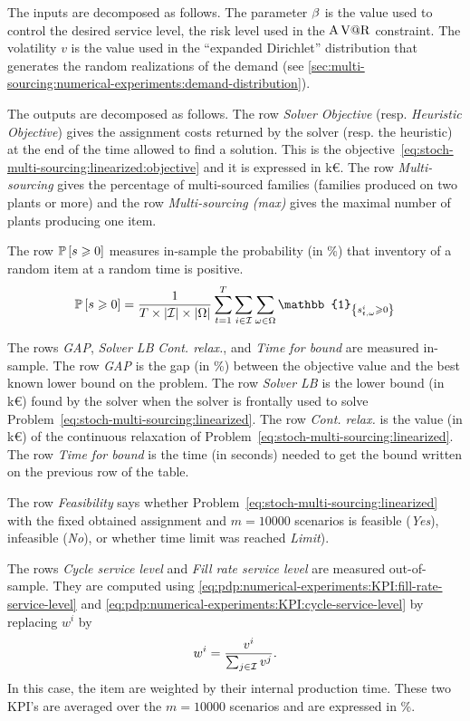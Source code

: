 The inputs are decomposed as follows.
The parameter $\beta$ is the value used to control the desired service level, \ie the risk level used in the $\operatorname{A\operatorname{V@R}}$ constraint.
The volatility $v$ is the value used in the ``expanded Dirichlet'' distribution that generates the random realizations of the demand (see \cref{sec:multi-sourcing:numerical-experiments:demand-distribution}).


The outputs are decomposed as follows.
The row \emph{Solver Objective} (resp. \emph{Heuristic Objective}) gives the assignment costs returned by the solver (resp. the heuristic) at the end of the time allowed to find a solution.
This is the objective~\eqref{eq:stoch-multi-sourcing:linearized:objective} and it is expressed in k\euro{}.
The row \emph{Multi-sourcing} gives the percentage of multi-sourced families (\ie families produced on two plants or more) and the row \emph{Multi-sourcing (max)} gives the maximal number of plants producing one item.


The row $\prob\sqbracket{s\ge0}$ measures in-sample the probability (in \%) that inventory of a random item at a random time is positive.
\begin{equation}
  \prob\sqbracket{s\ge0}=\frac{1}{\horizon\times\card{\REF}\times\card{\scenarios}}\sum_{t=1}^{\horizon}\sum_{i\in\REF}\sum_{\omega\in\scenarios} \mathbb{1}_{\crbracket{\inventory_{t,\omega}^i\ge0}}
\end{equation}


The rows \emph{GAP}, \emph{Solver LB} \emph{Cont. relax.}, and \emph{Time for bound} are measured in-sample.
The row \emph{GAP} is the gap (in \%) between the objective value and the best known lower bound on the problem.
The row \emph{Solver LB} is the lower bound (in k\euro{}) found by the solver when the solver is frontally used to solve Problem~\eqref{eq:stoch-multi-sourcing:linearized}.
The row \emph{Cont. relax.} is the value (in k\euro{}) of the continuous relaxation of Problem~\eqref{eq:stoch-multi-sourcing:linearized}.
The row \emph{Time for bound} is the time (in seconds) needed to get the bound written on the previous row of the table.


The row \emph{Feasibility} says whether Problem~\eqref{eq:stoch-multi-sourcing:linearized} with the fixed obtained assignment and $m=10000$ scenarios is feasible (\emph{Yes}), infeasible (\emph{No}), or whether time limit was reached \emph{Limit}).


The rows \emph{Cycle service level} and \emph{Fill rate service level} are measured out-of-sample.
They are computed using \cref{eq:pdp:numerical-experiments:KPI:fill-rate-service-level} and \cref{eq:pdp:numerical-experiments:KPI:cycle-service-level} by replacing $w^i$ by
\begin{equation}\label{eq:multi-sourcing:numerical-experiments:KPI:weight}
  w^i=\frac{v^i}{\sum_{j\in\mathcal{I}}v^j}.
\end{equation}
In this case, the item are weighted by their internal production time.
These two KPI's are averaged over the $m=10000$ scenarios and are expressed in \%.


